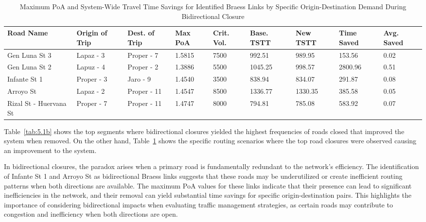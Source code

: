 {
\footnotesize 
\setlength{\tabcolsep}{1.5pt}  
\renewcommand{\thetable}{5.2b}
\begin{longtable}{|p{2.5cm}|p{1.5cm}|p{1.6cm}|p{1.2cm}|p{1.4cm}|p{1.4cm}|p{1.4cm}|p{1.3cm}|p{1.3cm}|} 

\hline
\textbf{Road Name} & \textbf{Origin of Trip} & \textbf{Dest. of Trip} & \textbf{Max PoA} & \textbf{Crit. Vol.} & \textbf{Base. TSTT} & \textbf{New TSTT} & \textbf{Time Saved} & \textbf{Avg. Saved} \\ \hline
\endhead



\hline
\endfoot

\hline
\caption{Maximum PoA and System-Wide Travel Time Savings for Identified Braess Links by Specific Origin-Destination Demand During Bidirectional Closure}
\label{tab:5.2b}
\endlastfoot

Gen Luna St 3 & Lapaz - 3 & Proper - 7 & 1.5815 & 7500 & 992.51 & 989.95 & 153.56 & 0.02 \\ \hline
Gen Luna St 2 & Lapuz - 4 & Proper - 2 & 1.3886 & 5500 & 1045.25 & 998.57 & 2800.96 & 0.51 \\ \hline
Infante St 1 & Proper - 3 & Jaro - 9 & 1.4540 & 3500 & 838.94 & 834.07 & 291.87 & 0.08 \\ \hline
Arroyo St & Lapaz - 2 & Proper - 11 & 1.4547 & 8500 & 1336.77 & 1330.35 & 385.58 & 0.05 \\ \hline
Rizal St - Huervana St & Proper - 7 & Proper - 11 & 1.4747 & 8000 & 794.81 & 785.08 & 583.92 & 0.07 \\ \hline

\end{longtable}
}

Table~\ref{tab:5.1b} shows the top segments where bidirectional closures yielded the highest frequencies of roads closed that improved the system when removed. On the other hand, Table~\ref{tab:5.2b} shows the specific routing scenarios where the top road closures were observed causing an improvement to the system.

In bidirectional closures, the paradox arises when a primary road is fundamentally redundant to the network's efficiency. The identification of Infante St 1 and Arroyo St as bidirectional Braess links suggests that these roads may be underutilized or create inefficient routing patterns when both directions are available. The maximum PoA values for these links indicate that their presence can lead to significant inefficiencies in the network, and their removal can yield substantial time savings for specific origin-destination pairs. This highlights the importance of considering bidirectional impacts when evaluating traffic management strategies, as certain roads may contribute to congestion and inefficiency when both directions are open.

